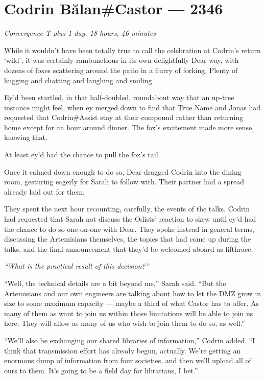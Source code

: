 \hypertarget{codrin-bux103lancastor-2346}{%
\chapter{Codrin Bălan\#Castor — 2346}\label{codrin-bux103lancastor-2346}}

\begin{center}
\emph{Convergence T-plus 1 day, 18 hours, 46 minutes}
\end{center}

\noindent While it wouldn't have been totally true to call the celebration at Codrin's return `wild', it was certainly rambunctious in its own delightfully Dear way, with dozens of foxes scattering around the patio in a flurry of forking. Plenty of hugging and chatting and laughing and smiling.

Ey'd been startled, in that half-doubled, roundabout way that an up-tree instance might feel, when ey merged down to find that True Name and Jonas had requested that Codrin\#Assist stay at their compound rather than returning home except for an hour around dinner. The fox's excitement made more sense, knowing that.

At least ey'd had the chance to pull the fox's tail.

Once it calmed down enough to do so, Dear dragged Codrin into the dining room, gesturing eagerly for Sarah to follow with. Their partner had a spread already laid out for them.

They spent the next hour recounting, carefully, the events of the talks. Codrin had requested that Sarah not discuss the Odists' reaction to skew until ey'd had the chance to do so one-on-one with Dear. They spoke instead in general terms, discussing the Artemisians themselves, the topics that had come up during the talks, and the final announcement that they'd be welcomed aboard as fifthrace.

\emph{``What is the practical result of this decision?''}

``Well, the technical details are a bit beyond me,'' Sarah said. ``But the Artemisians and our own engineers are talking about how to let the DMZ grow in size to some maximum capacity — maybe a third of what Castor has to offer. As many of them as want to join us within those limitations will be able to join us here. They will allow as many of us who wish to join them to do so, as well.''

``We'll also be exchanging our shared libraries of information,'' Codrin added. ``I think that transmission effort has already begun, actually. We're getting an enormous dump of information from four societies, and then we'll upload all of ours to them. It's going to be a field day for librarians, I bet.''

